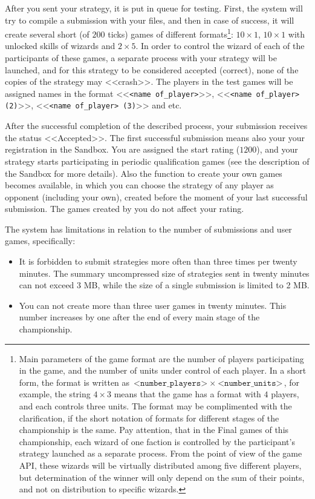 After you sent your strategy, it is put in queue for testing. First, the system will try to compile a submission with your
files, and then in case of success, it will create several short (of $200$ ticks) games of different formats\footnote[16]{Main
parameters of the game format are the number of players participating in the game, and the number of units under control of each player.
In a short form, the format is written as $\texttt{<number\_players>}~\times~\texttt{<number\_units>}$, for example, the string $4\times3$ means
that the game has a format with $4$ players, and each controls three units. The format may be complimented with the clarification, if
the short notation of formats for different stages of the championship is the same. Pay attention, that in the Final games of this championship, each wizard of
one faction is controlled by the participant's strategy launched as a separate process. From the point of view of the game API, these wizards
will be virtually distributed among five different players, but determination of the winner will only depend on the sum of their points, and not on
distribution to specific wizards.}: $10\times1$, $10\times1$ with unlocked skills of wizards and $2\times5$. In order to control
the wizard of each of the participants of these games, a separate process with your strategy will be launched, and for this strategy
to be considered accepted (correct), none of the copies of the strategy may <<crash>>. The players in the test games will be assigned names in the
format <<\texttt{<name of\_player>}>>, <<\texttt{<name of\_player> (2)}>>, <<\texttt{<name of\_player> (3)}>> and etc.

After the successful completion of the described process, your submission receives the status <<Accepted>>. The first successful submission means also your
your registration in the Sandbox. You are assigned the start rating ($1200$), and your strategy starts participating in periodic
qualification games (see the description of the Sandbox for more details). Also the function to create
your own games becomes available, in which you can choose the strategy of any player as opponent (including your own), created before
the moment of your last successful submission. The games created by you do not affect your rating.

The system has limitations in relation to the number of submissions and user games, specifically:
\vspace{-0.15in}
\begin{itemize}
  \item It is forbidden to submit strategies more often than three times per twenty minutes. The summary uncompressed size of strategies
        sent in twenty minutes can not exceed 3 MB, while the size of a single submission is limited to 2 MB.
\vspace{-0.10in}
  \item You can not create more than three user games in twenty minutes. This number increases by one after the end of every main stage of
        the championship.
\vspace{-0.10in}
\end{itemize}


